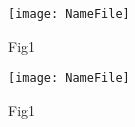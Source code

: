 \begin{wrapfigure}{r}{0.35\textwidth}
    \centering
    \texttt{[image: NameFile]}
    \caption{Fig1}
\end{wrapfigure}

\begin{figure}[h]
    \centering
    \texttt{[image: NameFile]}
    \caption{Fig1}
\end{figure}